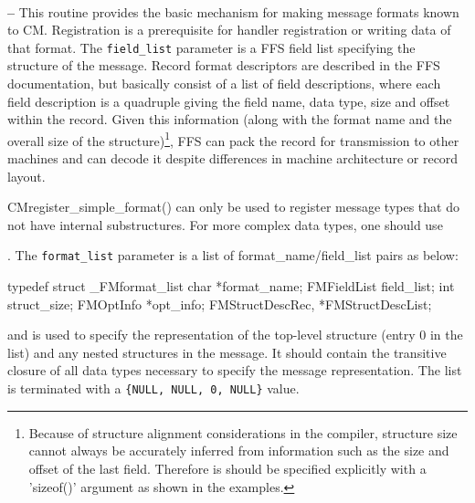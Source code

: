 \documentclass[11pt]{article}
\begin{document}
\begin{description}
\newsavebox{\mybox}
\item[{\usebox{\mybox}}]\ \\
{\bf --} This routine provides the basic mechanism for making message
formats known to CM.  Registration is a prerequisite for handler
registration or writing data of that format.  The {\tt field\_list}
parameter is a FFS field list specifying the structure of the message.
Record format descriptors are described in the FFS documentation, but
basically consist of a list of field descriptions, where  each field
description is a quadruple giving the field name, data type, size and offset
within the record.  Given this information (along with the format name
and the overall size of the structure)\footnote{Because of structure
  alignment considerations in the compiler, structure size cannot
  always be accurately inferred from information such as the size and
  offset of the last field.  Therefore is should be specified
  explicitly with a 'sizeof()' argument as shown in the examples.}, FFS can pack the record for
transmission to other machines and can decode it despite differences in
machine architecture or record layout.  

CMregister\_simple\_format() can only be used to register message
types that do not have internal substructures.  For more complex data
types, one should use 
\newsavebox{\minebox}
\item[{\usebox{\minebox}}].  The {\tt format\_list} parameter is a list of
format\_name/field\_list pairs as below:
\begin{verbatimtab}
	typedef struct _FMformat_list {
	    char *format_name;
	    FMFieldList field_list;
	    int struct_size;
	    FMOptInfo *opt_info;
	} FMStructDescRec, *FMStructDescList;
\end{verbatimtab}
and is used to specify the representation of the top-level structure
(entry 0 in the list) and any nested structures in the
message.  It should contain the transitive closure of all data types
necessary to specify the message representation.  The list is
terminated with a \verb+{NULL, NULL, 0, NULL}+ value. 


\end{description}
\end{document}
